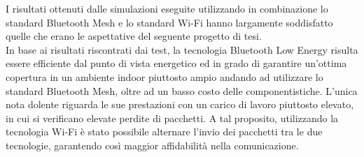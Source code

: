 I risultati ottenuti dalle simulazioni eseguite utilizzando in combinazione lo standard Bluetooth Mesh e lo standard Wi-Fi hanno largamente soddisfatto quelle che erano le aspettative del seguente progetto di tesi.\\
In base ai risultati riscontrati dai test, la tecnologia Bluetooth Low Energy risulta essere efficiente dal punto di vista energetico ed in grado di garantire un'ottima copertura in un ambiente indoor piuttosto ampio andando ad utilizzare lo standard Bluetooth Mesh, oltre ad un basso costo delle componentistiche. L'unica nota dolente riguarda le sue prestazioni con un carico di lavoro piuttosto elevato, in cui si verificano elevate perdite di pacchetti. A tal proposito, utilizzando la tecnologia Wi-Fi è stato possibile alternare l'invio dei pacchetti tra le due tecnologie, garantendo così maggior affidabilità nella comunicazione.\\



